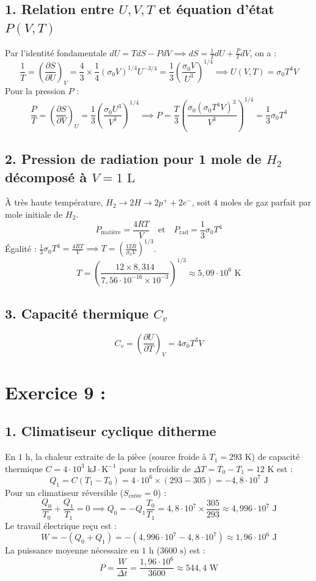 \documentclass[a4paper,12pt]{article}
\begin{document}
 	\subsection*{1. Relation entre $U, V, T$ et équation d'état $P(V,T)$}
 	Par l'identité fondamentale $dU = TdS - PdV \implies dS = \frac{1}{T}dU + \frac{P}{T}dV$, on a :
 	\[ \frac{1}{T} = \left(\frac{\partial S}{\partial U}\right)_V = \frac{4}{3} \times \frac{1}{4} (\sigma_0 V)^{1/4} U^{-3/4} = \frac{1}{3} \left(\frac{\sigma_0 V}{U^3}\right)^{1/4} \implies U(V,T) = \sigma_0 T^4 V \]
 	Pour la pression $P$ :
 	\[ \frac{P}{T} = \left(\frac{\partial S}{\partial V}\right)_U = \frac{1}{3} \left(\frac{\sigma_0 U^3}{V^3}\right)^{1/4} \implies P = \frac{T}{3} \left(\frac{\sigma_0 (\sigma_0 T^4 V)^3}{V^3}\right)^{1/4} = \frac{1}{3}\sigma_0 T^4 \]
 	
 	\subsection*{2. Pression de radiation pour 1 mole de $H_2$ décomposé à $V = 1\text{ L}$}
 	À très haute température, $H_2 \rightarrow 2H \rightarrow 2p^+ + 2e^-$, soit $4\text{ moles}$ de gaz parfait par mole initiale de $H_2$.
 	\[ P_{\text{matière}} = \frac{4 R T}{V} \quad \text{et} \quad P_{\text{rad}} = \frac{1}{3}\sigma_0 T^4 \]
 	Égalité : $\frac{1}{3}\sigma_0 T^4 = \frac{4 R T}{V} \implies T = \left(\frac{12 R}{\sigma_0 V}\right)^{1/3}$.
 	\[ T = \left(\frac{12 \times 8,314}{7,56\cdot 10^{-16} \times 10^{-3}}\right)^{1/3} \approx 5,09 \cdot 10^6\text{ K} \]
 	
 	\subsection*{3. Capacité thermique $C_v$}
 	\[ C_v = \left(\frac{\partial U}{\partial T}\right)_V = 4 \sigma_0 T^3 V \]
 	
 	\newpage
 	
 	\section*{Exercice 9 : }
 	\subsection*{1. Climatiseur cyclique ditherme}
 	En $1\text{ h}$, la chaleur extraite de la pièce (source froide à $T_1 = 293\text{ K}$) de capacité thermique $C = 4\cdot 10^3\text{ kJ}\cdot\text{K}^{-1}$ pour la refroidir de $\Delta T = T_0 - T_1 = 12\text{ K}$ est :
 	\[ Q_1 = C (T_1 - T_0) = 4\cdot 10^6 \times (293 - 305) = -4,8\cdot 10^7\text{ J} \]
 	Pour un climatiseur réversible ($S_{\text{créée}} = 0$) :
 	\[ \frac{Q_0}{T_0} + \frac{Q_1}{T_1} = 0 \implies Q_0 = -Q_1 \frac{T_0}{T_1} = 4,8\cdot 10^7 \times \frac{305}{293} \approx 4,996 \cdot 10^7\text{ J} \]
 	Le travail électrique reçu est :
 	\[ W = - (Q_0 + Q_1) = -(4,996\cdot 10^7 - 4,8\cdot 10^7) \approx 1,96\cdot 10^6\text{ J} \]
 	La puissance moyenne nécessaire en $1\text{ h}$ ($3600\text{ s}$) est :
 	\[ P = \frac{W}{\Delta t} = \frac{1,96\cdot 10^6}{3600} \approx 544,4\text{ W} \]
 	
\end{document}
